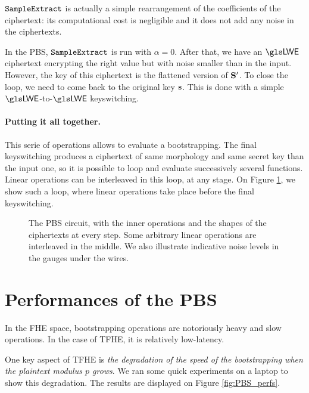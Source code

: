 $\texttt{SampleExtract}$ is actually a simple rearrangement of the coefficients of the ciphertext: its computational cost is negligible and it does not add any noise in the ciphertexts.






In the \gls{PBS}, $\texttt{SampleExtract}$ is run with $\alpha = 0$. After that, we have an $\LWE$ ciphertext encrypting the right value but with noise smaller than in the input. However, the key of this ciphertext is the flattened version of $\mathbf S'$. To close the loop, we need to come back to the original key $\mathbf s$. This is done with a simple $\LWE$-to-$\LWE$ keyswitching.



\paragraph{Putting it all together.}
This serie of operations allows to evaluate a bootstrapping. The final keyswitching produces a ciphertext of same morphology and same secret key than the input one, so it is possible to loop and evaluate successively several functions. Linear operations can be interleaved in this loop, at any stage. On Figure \ref{fig:PBS_layout}, we show such a loop, where linear operations take place before the final keyswitching.



\begin{figure}
	\centering
	
	\caption{The \gls{PBS} circuit, with the inner operations and the shapes of the ciphertexts at every step. Some arbitrary linear operations are interleaved in the middle. We also illustrate indicative noise levels in the gauges under the wires.}
	\label{fig:PBS_layout}
\end{figure}


\section{Performances of the \gls{PBS}}
\label{sec:pbs_performances}


In the \gls{FHE} space, bootstrapping operations are notoriously heavy and slow operations. In the case of \gls{TFHE}, it is relatively low-latency. 

One key aspect of \gls{TFHE} is \textit{the degradation of the speed of the bootstrapping when the plaintext modulus $p$ grows}. We ran some quick experiments on a laptop to show this degradation. The results are displayed on Figure \ref{fig:PBS_perfs}.


